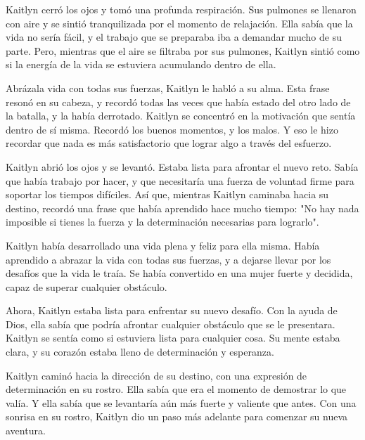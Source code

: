 

Kaitlyn cerró los ojos y tomó una profunda respiración. Sus pulmones se llenaron con aire y se sintió tranquilizada por el momento de relajación. Ella sabía que la vida no sería fácil, y el trabajo que se preparaba iba a demandar mucho de su parte. Pero, mientras que el aire se filtraba por sus pulmones, Kaitlyn sintió como si la energía de la vida se estuviera acumulando dentro de ella.

Abrázala vida con todas sus fuerzas, Kaitlyn le habló a su alma. Esta frase resonó en su cabeza, y recordó todas las veces que había estado del otro lado de la batalla, y la había derrotado. Kaitlyn se concentró en la motivación que sentía dentro de sí misma. Recordó los buenos momentos, y los malos. Y eso le hizo recordar que nada es más satisfactorio que lograr algo a través del esfuerzo.

Kaitlyn abrió los ojos y se levantó. Estaba lista para afrontar el nuevo reto. Sabía que había trabajo por hacer, y que necesitaría una fuerza de voluntad firme para soportar los tiempos difíciles. Así que, mientras Kaitlyn caminaba hacia su destino, recordó una frase que había aprendido hace mucho tiempo: "No hay nada imposible si tienes la fuerza y la determinación necesarias para lograrlo".

Kaitlyn había desarrollado una vida plena y feliz para ella misma. Había aprendido a abrazar la vida con todas sus fuerzas, y a dejarse llevar por los desafíos que la vida le traía. Se había convertido en una mujer fuerte y decidida, capaz de superar cualquier obstáculo.

Ahora, Kaitlyn estaba lista para enfrentar su nuevo desafío. Con la ayuda de Dios, ella sabía que podría afrontar cualquier obstáculo que se le presentara. Kaitlyn se sentía como si estuviera lista para cualquier cosa. Su mente estaba clara, y su corazón estaba lleno de determinación y esperanza.

Kaitlyn caminó hacia la dirección de su destino, con una expresión de determinación en su rostro. Ella sabía que era el momento de demostrar lo que valía. Y ella sabía que se levantaría aún más fuerte y valiente que antes. Con una sonrisa en su rostro, Kaitlyn dio un paso más adelante para comenzar su nueva aventura.